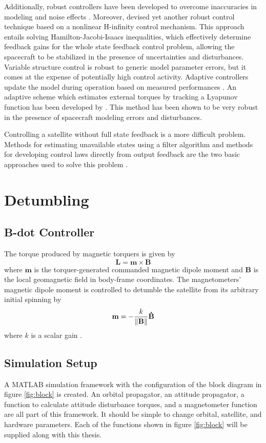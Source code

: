 Additionally, robust controllers have been developed to overcome inaccuracies in modeling and noise effects \cite{markley2014fundamentals}. Moreover, \cite{crassidis2000optimal} devised yet another robust control technique based on a nonlinear H-infinity control mechanism. This approach entails solving Hamilton-Jacobi-Isaacs inequalities, which effectively determine feedback gains for the whole state feedback control problem, allowing the spacecraft to be stabilized in the presence of uncertainties and disturbances. Variable structure control is robust to generic model parameter errors, but it comes at the expense of potentially high control activity.  Adaptive controllers update the model during operation based on measured performances \cite{markley2014fundamentals}. An adaptive scheme which estimates external torques by tracking a Lyapunov function has been developed by \cite{schaub2001adaptive}. This method has been shown to be very robust in the presence of spacecraft modeling errors and disturbances.

Controlling a satellite without full state feedback is a more difficult problem. Methods for estimating unavailable states using a filter algorithm and methods for developing control laws directly from output feedback are the two basic approaches used to solve this problem \cite{markley2014fundamentals}. 


\section{Detumbling}

\subsection{B-dot Controller}
The torque produced by magnetic torquers is given by
\begin{equation} \label{eqn:control_law}
    \mathbf{L} = \mathbf{m} \times \mathbf{B}
\end{equation}
where $\mathbf{m}$ is the torquer-generated commanded magnetic dipole moment and $\mathbf{B}$ is the local geomagnetic field in body-frame coordinates. The magnetometers' magnetic dipole moment is controlled to detumble the satellite from its arbitrary initial spinning by 
\begin{equation}
    \mathbf{m} = - \frac{k}{\norm{\mathbf{B}}} \mathbf{\dot{B}}
\end{equation}
where $k$ is a scalar gain \cite{markley2014fundamentals}. 
\subsection{Simulation Setup}
A MATLAB simulation framework with the configuration of the block diagram in figure \ref{fig:block} is created. An orbital propagator, an attitude propagator, a function to calculate attitude disturbance torques, and a magnetometer function are all part of this framework. It should be simple to change orbital, satellite, and hardware parameters. Each of the functions shown in figure \ref{fig:block} will be supplied along with this thesis.
\clearpage

